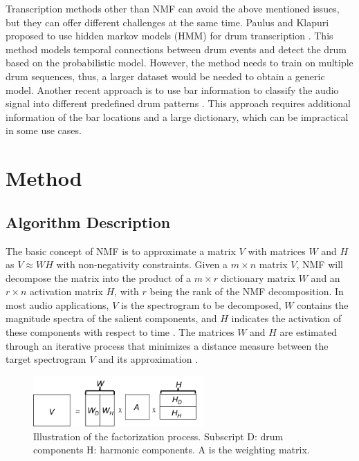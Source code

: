 \documentclass{article}
\begin{document}
Transcription methods other than NMF can avoid the above mentioned issues, but they can offer different challenges at the same time. Paulus and Klapuri proposed to use hidden markov models (HMM) for drum transcription \cite{Paulus2009a}. This method models temporal connections between drum events and detect the drum based on the probabilistic model. However, the method needs to train on multiple drum sequences, thus, a larger dataset would be needed to obtain a generic model. Another recent approach is to use bar information to classify the audio signal into different predefined drum patterns \cite{Thompson2014}. This approach requires additional information of the bar locations and a large dictionary, which can be impractical in some use cases.   


\section{Method}\label{sec:method}
\subsection{Algorithm Description}\label{subsec:algorithm}
The basic concept of NMF is to approximate a matrix $V$ with matrices $W$ and $H$ as $V \approx WH$ with non-negativity constraints. Given a $m \times n$ matrix $V$, NMF will decompose the matrix into the product of a $m \times r$ dictionary matrix $W$ and an $r \times n$ activation matrix $H$, with $r$ being the rank of the NMF decomposition. In most audio applications, $V$ is the spectrogram to be decomposed, $W$ contains the magnitude spectra of the salient components, and $H$ indicates the activation of these components with respect to time \cite{smaragdis_non-negative_2003}. The matrices $W$ and $H$ are estimated through an iterative process that minimizes a distance measure between the target spectrogram $V$ and its approximation \cite{lee_algorithms_2000}. 

\begin{figure}
 \centering 
  \centerline{
 \includegraphics[width=6.5cm]{factorization.png}}
 \caption{Illustration of the factorization process. Subscript $\mathrm{D}$: drum components $\mathrm{H}$: harmonic components. $\mathrm{A}$ is the weighting matrix. }
 \label{fig:factorization}
\end{figure}
\end{document}
